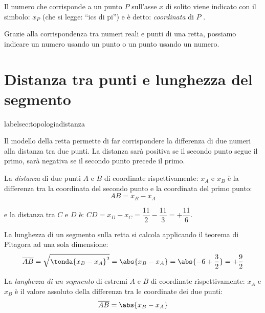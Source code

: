 \vspace{.5em}
Il numero che corrisponde a un punto \(P\) sull'asse \(x\) 
di solito viene indicato con il simbolo: \(x_P\) (che si legge: ``ics di pi'')
e è detto: \emph{coordinata} di \(P\) .

Grazie alla corrispondenza tra numeri reali e punti di una retta, 
possiamo indicare un numero usando un punto o un punto usando un numero.

\section{Distanza tra punti e lunghezza del segmento}
label{sec:topologiadistanza}

Il modello della retta permette di far corrispondere la differenza di due 
numeri alla distanza tra due punti. 
La distanza sarà positiva se il secondo punto segue il primo, sarà negativa se 
il secondo punto precede il primo.

\begin{newdef}{}{}
La \emph{distanza} di due punti \(A\) e \(B\) di coordinate rispettivamente:
\(x_A\) e \(x_B\) è la differenza tra la coordinata del secondo punto e la 
coordinata del primo punto: 
\[AB = x_B -x_A\]
\end{newdef}

\vspace{.5em}

\noindent e la distanza tra \(C\) e \(D\) è: \quad
\(CD = x_D - x_C = \dfrac{11}{2} - \dfrac{11}{3} = +\dfrac{11}{6}\).

La lunghezza di un segmento sulla retta si calcola applicando il teorema di 
Pitagora ad una sola dimensione:
\[\overline{AB} = \sqrt{\tonda{x_B - x_A}^2} = \abs{x_B - x_A}=
  \abs{-6 + \dfrac{3}{2}} = +\dfrac{9}{2}\]

\begin{newdef}{}{}
La \emph{lunghezza di un segmento} di estremi \(A\) e \(B\) di coordinate 
rispettivamente:
\(x_A\) e \(x_B\) è il valore assoluto della differenza tra le coordinate dei 
due punti: 
\[\overline{AB} = \abs{x_B -x_A}\]
\end{newdef}

\newcommand{\lung}[2]{\mathcal{L}\punto{#1}{#2}}

